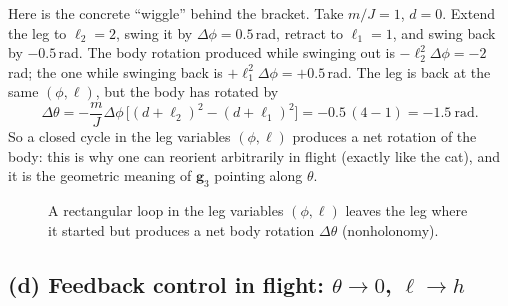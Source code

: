 \documentclass[11pt,a4paper]{article}
\theoremstyle{definition}
\theoremstyle{plain}
\theoremstyle{remark}
\newcommand{\g}{\boldsymbol{g}}
\begin{document}
\begin{intuition}
Here is the concrete ``wiggle'' behind the bracket. Take $m/J=1$, $d=0$. Extend the leg to $\ell_2=2$, swing it by $\Delta\phi=0.5$\,rad, retract to $\ell_1=1$, and swing back by $-0.5$\,rad. The body rotation produced while swinging out is $-\ell_2^2\Delta\phi=-2$\,rad; the one while swinging back is $+\ell_1^2\Delta\phi=+0.5$\,rad. The leg is back at the same $(\phi,\ell)$, but the body has rotated by
\[
  \Delta\theta=-\frac{m}{J}\Delta\phi\,\big[(d+\ell_2)^2-(d+\ell_1)^2\big]=-0.5\,(4-1)=-1.5\ \text{rad}.
\]
So a closed cycle in the leg variables $(\phi,\ell)$ produces a net rotation of the body: this is why one can reorient arbitrarily in flight (exactly like the cat), and it is the geometric meaning of $\g_3$ pointing along $\theta$.
\end{intuition}

\begin{figure}[H]
\centering
{}
\caption{A rectangular loop in the leg variables $(\phi,\ell)$ leaves the leg where it started but produces a net body rotation $\Delta\theta$ (nonholonomy).}
\end{figure}

\subsection{(d) Feedback control in flight: $\theta\to0$, $\ell\to h$}
\end{document}
